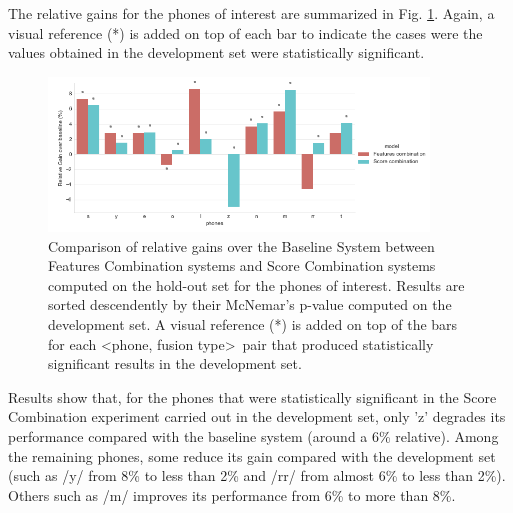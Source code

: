 

The relative gains for the phones of interest are summarized in Fig. \ref{fig:fusionMcnemarTest}.
Again, a visual reference (*) is added on top of each bar to indicate the cases were the
values obtained in the development set were statistically significant.

\begin{figure}[H]
	\centering
	\includegraphics[width=0.9\textwidth]{files/figures/results/relatives/relative-fusion-systems-heldout-mcnemar.png}
	\caption{Comparison of relative gains over the Baseline System
	between Features Combination systems and Score Combination
	systems computed on the hold-out set for the phones of interest.
	Results are sorted descendently by their McNemar's p-value computed on the development set.
	A visual reference (*) is added on top of the bars
	for each \textless phone, fusion type\textgreater \ pair that produced
	statistically significant results in the development set.}
	\label{fig:fusionMcnemarTest}
\end{figure}

Results show that, for the phones that were statistically significant in the Score Combination
experiment carried out in the development set, only 'z' degrades its performance compared
with the baseline system (around a 6\% relative). Among the
remaining phones, some reduce its gain compared with the development set (such as
/y/ from 8\% to less than 2\% and /rr/ from almost 6\% to less than 2\%). Others such
as /m/ improves its performance from 6\% to more than 8\%.

